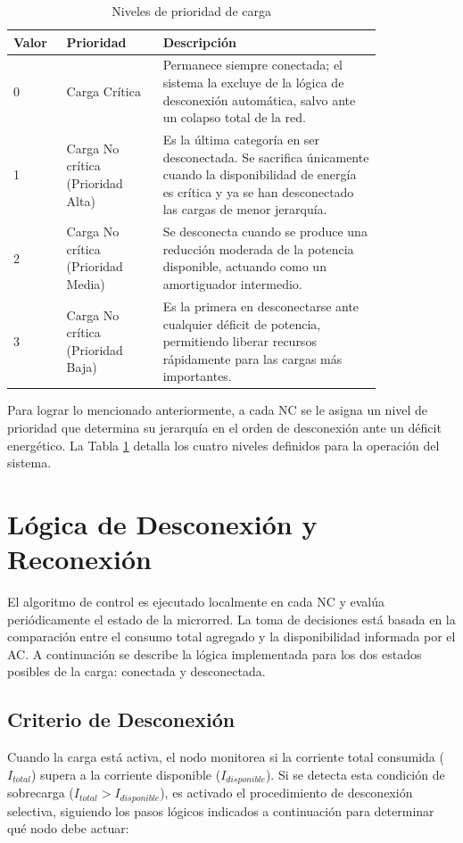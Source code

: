 \begin{table}[H]
\centering
\caption{Niveles de prioridad de carga}
\label{tab:niveles_prioridad}
\begin{tabular}{|p{0.10\linewidth}|p{0.22\linewidth}|p{0.50\linewidth}|}
\hline
\textbf{Valor} & \textbf{Prioridad} & \textbf{Descripción} \\ \hline
0 & Carga Crítica & Permanece siempre conectada; el sistema la excluye de la lógica de desconexión automática, salvo ante un colapso total de la red. \\ \hline
1 & Carga No crítica (Prioridad Alta) & Es la última categoría en ser desconectada. Se sacrifica únicamente cuando la disponibilidad de energía es crítica y ya se han desconectado las cargas de menor jerarquía. \\ \hline
2 & Carga No crítica (Prioridad Media) & Se desconecta cuando se produce una reducción moderada de la potencia disponible, actuando como un amortiguador intermedio. \\ \hline
3 & Carga No crítica (Prioridad Baja) & Es la primera en desconectarse ante cualquier déficit de potencia, permitiendo liberar recursos rápidamente para las cargas más importantes. \\ \hline
\end{tabular}
\end{table}

Para lograr lo mencionado anteriormente, a cada NC se le asigna un nivel de prioridad que determina su jerarquía en el orden de desconexión ante un déficit energético. La Tabla \ref{tab:niveles_prioridad} detalla los cuatro niveles definidos para la operación del sistema.

\section{Lógica de Desconexión y Reconexión}

El algoritmo de control es ejecutado localmente en cada NC y evalúa periódicamente el estado de la microrred. La toma de decisiones está basada en la comparación entre el consumo total agregado y la disponibilidad informada por el AC. A continuación se describe la lógica implementada para los dos estados posibles de la carga: conectada y desconectada.


\subsection{Criterio de Desconexión}
Cuando la carga está activa, el nodo monitorea si la corriente total consumida ($I_{total}$) supera a la corriente disponible ($I_{disponible}$). Si se detecta esta condición de sobrecarga ($I_{total} > I_{disponible}$), es activado el procedimiento de desconexión selectiva, siguiendo los pasos lógicos indicados a continuación para determinar qué nodo debe actuar:

